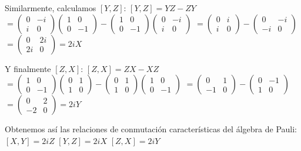 \begin{questions}
\begin{solution}
    Similarmente, calculamos $[Y,Z]$:
    $[Y,Z] = YZ - ZY$
    $= \begin{pmatrix} 0 & -i \\ i & 0 \end{pmatrix} \begin{pmatrix} 1 & 0 \\ 0 & -1 \end{pmatrix} - \begin{pmatrix} 1 & 0 \\ 0 & -1 \end{pmatrix} \begin{pmatrix} 0 & -i \\ i & 0 \end{pmatrix}$
    $= \begin{pmatrix} 0 & i \\ i & 0 \end{pmatrix} - \begin{pmatrix} 0 & -i \\ -i & 0 \end{pmatrix}$
    $= \begin{pmatrix} 0 & 2i \\ 2i & 0 \end{pmatrix} = 2iX$

    Y finalmente $[Z,X]$:
    $[Z,X] = ZX - XZ$
    $= \begin{pmatrix} 1 & 0 \\ 0 & -1 \end{pmatrix} \begin{pmatrix} 0 & 1 \\ 1 & 0 \end{pmatrix} - \begin{pmatrix} 0 & 1 \\ 1 & 0 \end{pmatrix} \begin{pmatrix} 1 & 0 \\ 0 & -1 \end{pmatrix}$
    $= \begin{pmatrix} 0 & 1 \\ -1 & 0 \end{pmatrix} - \begin{pmatrix} 0 & -1 \\ 1 & 0 \end{pmatrix}$
    $= \begin{pmatrix} 0 & 2 \\ -2 & 0 \end{pmatrix} = 2iY$

    Obtenemos así las relaciones de conmutación características del álgebra de Pauli:
    $[X,Y] = 2iZ$
    $[Y,Z] = 2iX$
    $[Z,X] = 2iY$


\end{solution}
\end{questions}
